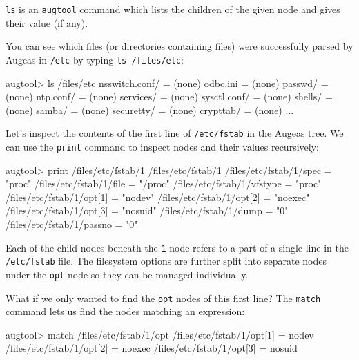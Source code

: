 \verb!ls! is an \verb!augtool! command which lists the children of the given node and gives their value (if any).

You can see which files (or directories containing files) were successfully parsed by Augeas in \texttt{/etc} by typing \verb!ls /files/etc!:

\begin{augtoolsh}[]
augtool> ls /files/etc
nsswitch.conf/ = (none)
odbc.ini = (none)
passwd/ = (none)
ntp.conf/ = (none)
services/ = (none)
sysctl.conf/ = (none)
shells/ = (none)
samba/ = (none)
securetty/ = (none)
crypttab/ = (none)
...
\end{augtoolsh}


Let's inspect the contents of the first line of \texttt{/etc/fstab} in the Augeas tree. We can use the \verb!print! command to inspect nodes and their values recursively:

\begin{augtoolsh}[]
augtool> print /files/etc/fstab/1
/files/etc/fstab/1
/files/etc/fstab/1/spec = "proc"
/files/etc/fstab/1/file = "/proc"
/files/etc/fstab/1/vfstype = "proc"
/files/etc/fstab/1/opt[1] = "nodev"
/files/etc/fstab/1/opt[2] = "noexec"
/files/etc/fstab/1/opt[3] = "nosuid"
/files/etc/fstab/1/dump = "0"
/files/etc/fstab/1/passno = "0"
\end{augtoolsh}

Each of the child nodes beneath the \verb!1! node refers to a part of a single line in the \texttt{/etc/fstab} file. The filesystem options are further split into separate nodes under the \verb!opt! node so they can be managed individually.

What if we only wanted to find the \verb!opt! nodes of this first line? The \verb!match! command lets us find the nodes matching an expression:


\begin{augtoolsh}[]
augtool> match /files/etc/fstab/1/opt
/files/etc/fstab/1/opt[1] = nodev
/files/etc/fstab/1/opt[2] = noexec
/files/etc/fstab/1/opt[3] = nosuid
\end{augtoolsh}

\begin{quote}
\end{quote}

